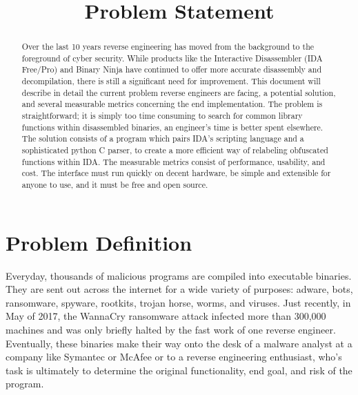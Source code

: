 \documentclass[10pt, draftclsnofoot, letterpaper, margin=.75in, onecolumn]{IEEEtran}
\begin{document}
\renewcommand{\familydefault}{\sfdefault}

\title{Problem Statement}
\author{
}

\begin{titlepage}
\maketitle
\begin{abstract}

Over the last 10 years reverse engineering has moved from the background to the foreground of cyber security. While products like the Interactive Disassembler (IDA Free/Pro) and Binary Ninja have continued to offer more accurate disassembly and decompilation, there is still a significant need for improvement. This document will describe in detail the current problem reverse engineers are facing, a potential solution, and several measurable metrics concerning the end implementation. The problem is straightforward; it is simply too time consuming to search for common library functions within disassembled binaries, an engineer's time is better spent elsewhere. The solution consists of a program which pairs IDA's scripting language and a sophisticated python C parser, to create a more efficient way of relabeling obfuscated functions within IDA. The measurable metrics consist of performance, usability, and cost. The interface must run quickly on decent hardware, be simple and extensible for anyone to use, and it must be free and open source.

\end{abstract}

\end{titlepage}


\section{Problem Definition}
Everyday, thousands of malicious programs are compiled into executable binaries. They are sent out across the internet for a wide variety of purposes: adware, bots, ransomware, spyware, rootkits, trojan horse, worms, and viruses. Just recently, in May of 2017, the WannaCry ransomware attack infected more than 300,000 machines and was only briefly halted by the fast work of one reverse engineer. Eventually, these binaries make their way onto the desk of a malware analyst at a company like Symantec or McAfee or to a reverse engineering enthusiast, who's task is ultimately to determine the original functionality, end goal, and risk of the program.\\
\end{document}
